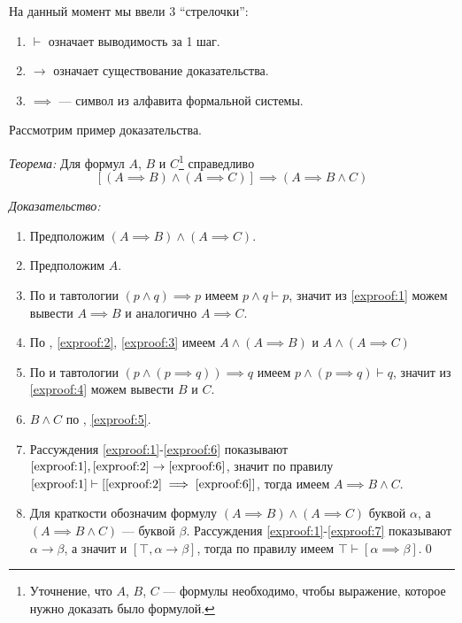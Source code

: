 На данный момент мы ввели 3 ``стрелочки'':
\begin{enumerate}
	\item{}$\vdash$ означает выводимость за 1 шаг.
	\item{}$\to$ означает существование доказательства.
	\item{}$\implies$ --- символ из алфавита формальной системы.
\end{enumerate}


Рассмотрим пример доказательства.

{\it Теорема:} Для формул $A$, $B$ и $C$\footnote{
	Уточнение, что $A$, $B$, $C$ --- формулы необходимо, чтобы выражение, которое
	нужно доказать было формулой.
} справедливо
\[
	[(A\implies B)\land (A\implies C)]\implies (A\implies B\land C)
\]

{\it Доказательство:}
\begin{enumerate}[label=(\arabic*)]
	\item{}Предположим $(A\implies B)\land (A\implies C)$.\label{exproof:1}

	\item{}Предположим $A$.\label{exproof:2}

	\item{}По \taut{} и тавтологии $(p\land q)\implies p$ имеем
	$p\land q\vdash p$, значит из \ref{exproof:1} можем вывести
	$A\implies B$ и аналогично $A\implies C$.\label{exproof:3}

	\item{}По \conj{}, \ref{exproof:2}, \ref{exproof:3}
	имеем $A\land (A\implies B)$ и $A\land (A\implies C)$
	\label{exproof:4}

	\item{}По \taut{} и тавтологии $(p\land (p\implies q))\implies q$
	имеем $p\land (p\implies q)\vdash q$, значит из \ref{exproof:4} можем вывести $B$
	и $C$.\label{exproof:5}

	\item{}$B\land C$ по \conj{}, \ref{exproof:5}.\label{exproof:6}

	\item{}Рассуждения \ref{exproof:1}-\ref{exproof:6} показывают
	$\ref{exproof:1},\ref{exproof:2}\to \ref{exproof:6}$, значит по правилу
	\implic{} $\ref{exproof:1}\vdash [\ref{exproof:2}\implies \ref{exproof:6}]$,
	тогда имеем $A\implies B\land C$.\label{exproof:7}

	\item{}Для краткости обозначим формулу
	$(A\implies B)\land (A\implies C)$ буквой $\alpha$,
	а $(A\implies B\land C)$ --- буквой $\beta$.
	Рассуждения \ref{exproof:1}-\ref{exproof:7} показывают $\alpha\to\beta$,
	а значит и $[\top,\alpha\to\beta]$, тогда по правилу \implic{}
	имеем $\top\vdash [\alpha\implies\beta]$.\qed
\end{enumerate}

